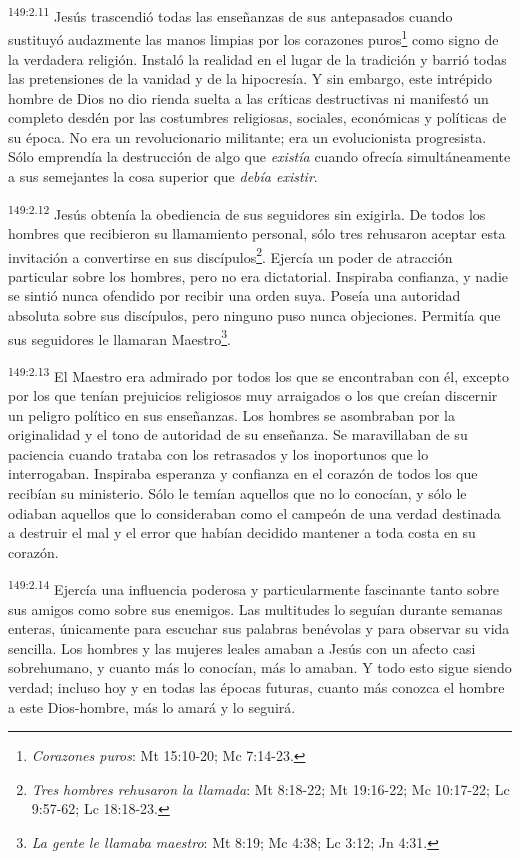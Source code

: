 \par 
\textsuperscript{149:2.11} Jesús trascendió todas las enseñanzas de sus antepasados cuando sustituyó audazmente las manos limpias por los corazones puros\footnote{\textit{Corazones puros}: Mt 15:10-20; Mc 7:14-23.} como signo de la verdadera religión. Instaló la realidad en el lugar de la tradición y barrió todas las pretensiones de la vanidad y de la hipocresía. Y sin embargo, este intrépido hombre de Dios no dio rienda suelta a las críticas destructivas ni manifestó un completo desdén por las costumbres religiosas, sociales, económicas y políticas de su época. No era un revolucionario militante; era un evolucionista progresista. Sólo emprendía la destrucción de algo que \textit{existía} cuando ofrecía simultáneamente a sus semejantes la cosa superior que \textit{debía existir}.

\par 
\textsuperscript{149:2.12} Jesús obtenía la obediencia de sus seguidores sin exigirla. De todos los hombres que recibieron su llamamiento personal, sólo tres rehusaron aceptar esta invitación a convertirse en sus discípulos\footnote{\textit{Tres hombres rehusaron la llamada}: Mt 8:18-22; Mt 19:16-22; Mc 10:17-22; Lc 9:57-62; Lc 18:18-23.}. Ejercía un poder de atracción particular sobre los hombres, pero no era dictatorial. Inspiraba confianza, y nadie se sintió nunca ofendido por recibir una orden suya. Poseía una autoridad absoluta sobre sus discípulos, pero ninguno puso nunca objeciones. Permitía que sus seguidores le llamaran Maestro\footnote{\textit{La gente le llamaba maestro}: Mt 8:19; Mc 4:38; Lc 3:12; Jn 4:31.}.

\par 
\textsuperscript{149:2.13} El Maestro era admirado por todos los que se encontraban con él, excepto por los que tenían prejuicios religiosos muy arraigados o los que creían discernir un peligro político en sus enseñanzas. Los hombres se asombraban por la originalidad y el tono de autoridad de su enseñanza. Se maravillaban de su paciencia cuando trataba con los retrasados y los inoportunos que lo interrogaban. Inspiraba esperanza y confianza en el corazón de todos los que recibían su ministerio. Sólo le temían aquellos que no lo conocían, y sólo le odiaban aquellos que lo consideraban como el campeón de una verdad destinada a destruir el mal y el error que habían decidido mantener a toda costa en su corazón.

\par 
\textsuperscript{149:2.14} Ejercía una influencia poderosa y particularmente fascinante tanto sobre sus amigos como sobre sus enemigos. Las multitudes lo seguían durante semanas enteras, únicamente para escuchar sus palabras benévolas y para observar su vida sencilla. Los hombres y las mujeres leales amaban a Jesús con un afecto casi sobrehumano, y cuanto más lo conocían, más lo amaban. Y todo esto sigue siendo verdad; incluso hoy y en todas las épocas futuras, cuanto más conozca el hombre a este Dios-hombre, más lo amará y lo seguirá.

